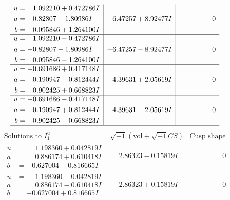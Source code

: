\documentclass[1p]{elsarticle_modified}
\theoremstyle{definition}
\newcommand{\I}{\sqrt{-1}}
\begin{document}
$$\begin{array}{c|c|c}
\begin{aligned}
u &= \phantom{-}1.092210 + 0.472786 I \\
a &= -0.82807 + 1.80986 I \\
b &= \phantom{-}0.095846 + 1.264100 I\end{aligned}
 & -6.47257 + 8.92477 I & \phantom{-0.000000 } 0 \\ \hline\begin{aligned}
u &= \phantom{-}1.092210 - 0.472786 I \\
a &= -0.82807 - 1.80986 I \\
b &= \phantom{-}0.095846 - 1.264100 I\end{aligned}
 & -6.47257 - 8.92477 I & \phantom{-0.000000 } 0 \\ \hline\begin{aligned}
u &= -0.691686 + 0.417148 I \\
a &= -0.190947 - 0.812444 I \\
b &= \phantom{-}0.902425 + 0.668823 I\end{aligned}
 & -4.39631 + 2.05619 I & \phantom{-0.000000 } 0 \\ \hline\begin{aligned}
u &= -0.691686 - 0.417148 I \\
a &= -0.190947 + 0.812444 I \\
b &= \phantom{-}0.902425 - 0.668823 I\end{aligned}
 & -4.39631 - 2.05619 I & \phantom{-0.000000 } 0\\
 \hline 
 \end{array}$$\newpage$$\begin{array}{c|c|c}  
\text{Solutions to }I^u_{1}& \I (\text{vol} + \sqrt{-1}CS) & \text{Cusp shape}\\
 \hline 
\begin{aligned}
u &= \phantom{-}1.198360 + 0.042819 I \\
a &= \phantom{-}0.886174 + 0.610418 I \\
b &= -0.627004 - 0.816665 I\end{aligned}
 & \phantom{-}2.86323 - 0.15819 I & \phantom{-0.000000 } 0 \\ \hline\begin{aligned}
u &= \phantom{-}1.198360 - 0.042819 I \\
a &= \phantom{-}0.886174 - 0.610418 I \\
b &= -0.627004 + 0.816665 I\end{aligned}
 & \phantom{-}2.86323 + 0.15819 I & \phantom{-0.000000 } 0 \\ \hline\begin{aligned}

\end{aligned}
\end{array}$$
\end{document}
